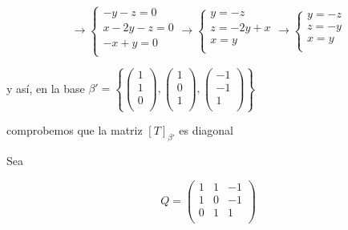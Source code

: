 \documentclass[12pt,a4paper]{article}
\begin{document}
\begin{enumerate}
    \begin{equation*}
        \longrightarrow  \left\{\begin{array}{cc}
             -y-z = 0  \\
             x-2y-z = 0 \\
             -x+y = 0 \\
        \end{array}\right. \longrightarrow
        \left\{\begin{array}{cc}
             y = -z  \\
             z = -2y+x \\
             x = y \\
        \end{array}\right. \longrightarrow  \left\{\begin{array}{cc}
             y = -z  \\
             z = -y \\
             x = y \\
        \end{array}\right.
    \end{equation*}
    
    y así, en la base $\beta' =\left\{ \left(\begin{array}{cc}
         1  \\
         1 \\
         0 \\
    \end{array}\right),\left(\begin{array}{cc}
         1 \\
         0 \\
         1 \\
    \end{array}\right),\left(\begin{array}{cc}
         -1 \\
         -1 \\
         1 \\
    \end{array}\right)\right\}$
    
    comprobemos que la matriz $[T]_{\beta'}$ es diagonal
    
    Sea 
    
    \begin{equation*}
        Q = \left(\begin{array}{lcc}
            1 & 1 & -1 \\
            1 & 0 & -1 \\
            0 & 1 & 1 \\
        \end{array}\right)
    \end{equation*}
    

\end{enumerate}
\end{document}

